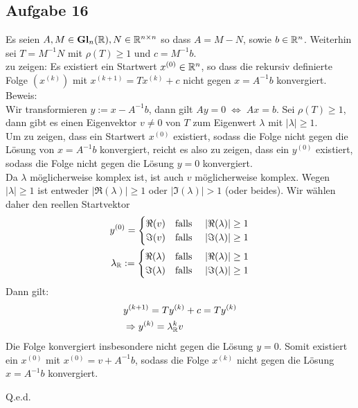 \subsection*{Aufgabe 16}

Es seien $A,M \in \mathbf{Gl}_n(\mathbb R), N \in \mathbb R^{n\times n}$ so dass $A=M-N$, sowie $b \in \mathbb R^n$. Weiterhin sei $T=M^{-1}N$ mit $\rho(T)\ge 1$ und $c=M^{-1}b$.\\
zu zeigen: Es existiert ein Startwert $x^{(0)} \in \mathbb R^n$, so dass die rekursiv definierte Folge $(x^{(k)})$ mit $x^{(k+1)}=Tx^{(k)}+c$ nicht gegen $x=A^{-1}b$ konvergiert.\\
\newline
Beweis:\\
Wir transformieren $y := x - A^{-1} b$, dann gilt $A y = 0 \; \Leftrightarrow \; A x = b$.
Sei $\rho(T)\ge 1$, dann gibt es einen Eigenvektor $v \neq 0$ von $T$ zum Eigenwert $\lambda$ mit $|\lambda|\ge 1$.\\
\newline
Um zu zeigen, dass ein Startwert $x^{(0)}$ existiert, sodass die Folge nicht gegen die Lösung von $x=A^{-1}b$ konvergiert, reicht es also zu zeigen, dass ein $y^{(0)}$ existiert, sodass die Folge nicht gegen die Lösung $y=0$ konvergiert.\\
\newline
Da $\lambda$ möglicherweise komplex ist, ist auch $v$ möglicherweise komplex. Wegen
$|\lambda| \ge 1$ ist entweder $|\Re(\lambda)| \ge 1$ oder $|\Im(\lambda)| > 1$ (oder beides).
Wir wählen daher den reellen Startvektor
\begin{align*}
  y^{(0)} = \begin{cases}
             \Re(v) \quad \text{falls } &|\Re(\lambda)| \ge 1\\
             \Im(v) \quad \text{falls } &|\Im(\lambda)| \ge 1\\
           \end{cases} \\
  \lambda_\mathbb R := \begin{cases}
             \Re(\lambda) \quad \text{falls } &|\Re(\lambda)| \ge 1\\
             \Im(\lambda) \quad \text{falls } &|\Im(\lambda)| \ge 1\\
           \end{cases}
\end{align*}
Dann gilt:
\begin{align*}
&y^{(k+1)}=Ty^{(k)}+ {c}=Ty^{(k)}\\
&\Rightarrow y^{(k)}=\lambda_\mathbb R^kv
\end{align*}
Die Folge konvergiert insbesondere nicht gegen die Lösung $y = 0$.
Somit existiert ein $x^{(0)}$ mit $x^{(0)}=v+A^{-1}b$, sodass die
Folge $x^{(k)}$ nicht gegen die Lösung $x=A^{-1}b$ konvergiert.
\begin{flushright}
Q.e.d.
\end{flushright}
